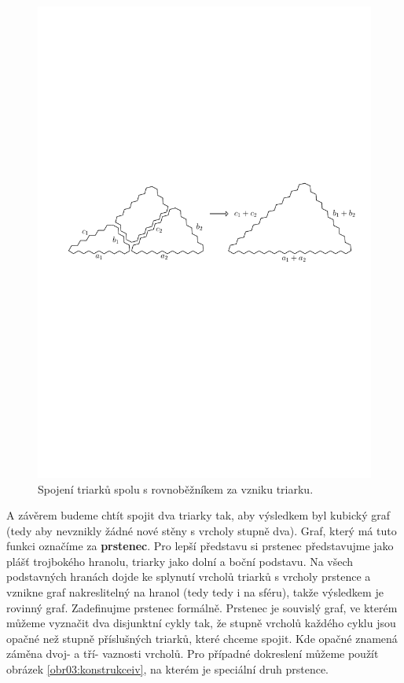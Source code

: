 \begin{figure}[h!]\centering
\includegraphics[width=\textwidth]{../img/T-T}
\caption{Spojení triarků spolu s rovnoběžníkem za vzniku triarku.}
\label{obr22:T-T}
\end{figure}

A závěrem budeme chtít spojit dva triarky tak, aby výsledkem byl kubický graf (tedy aby nevznikly žádné nové stěny s vrcholy stupně dva). Graf, který má tuto funkci označíme za \textbf{prstenec}. Pro lepší představu si prstenec představujme jako plášť trojbokého hranolu, triarky jako dolní a boční podstavu. Na všech podstavných hranách dojde ke splynutí vrcholů triarků s vrcholy prstence a vznikne graf nakreslitelný na hranol (tedy tedy i na sféru), takže výsledkem je rovinný graf. Zadefinujme prstenec formálně. Prstenec je souvislý graf, ve kterém můžeme vyznačit dva disjunktní cykly tak, že stupně vrcholů každého cyklu jsou opačné než stupně příslušných triarků, které chceme spojit. Kde opačné znamená záměna dvoj- a tří- vaznosti vrcholů. Pro případné dokreslení můžeme použít obrázek \ref{obr03:konstrukceiv}, na kterém je speciální druh prstence. 

